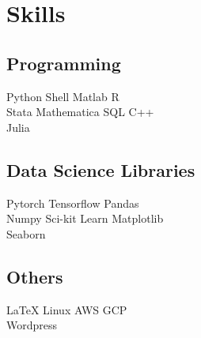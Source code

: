 \documentclass[letterpaper]{deedy-resume} %
\begin{document}
\begin{minipage}[t]{0.33\textwidth}
\sectionspace %


\section{Skills}

\subsection{Programming}

Python \textbullet{} Shell \textbullet{} Matlab \textbullet{} R \\
Stata \textbullet{} Mathematica \textbullet{} SQL \textbullet{} C++ \\ Julia \\
\subsection{Data Science Libraries}
Pytorch \textbullet{} Tensorflow \textbullet{} Pandas \\ Numpy \textbullet{} Sci-kit Learn \textbullet{} Matplotlib \\ Seaborn \\
\subsection{Others}
\LaTeX \textbullet{} Linux \textbullet{} AWS \textbullet{} GCP \\ Wordpress

\sectionspace %


\end{minipage} %
\hfill
%
%
\end{document}
